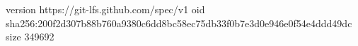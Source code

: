 version https://git-lfs.github.com/spec/v1
oid sha256:200f2d307b88b760a9380c6dd8bc58ec75db33f0b7e3d0e946e0f54e4ddd49dc
size 349692
